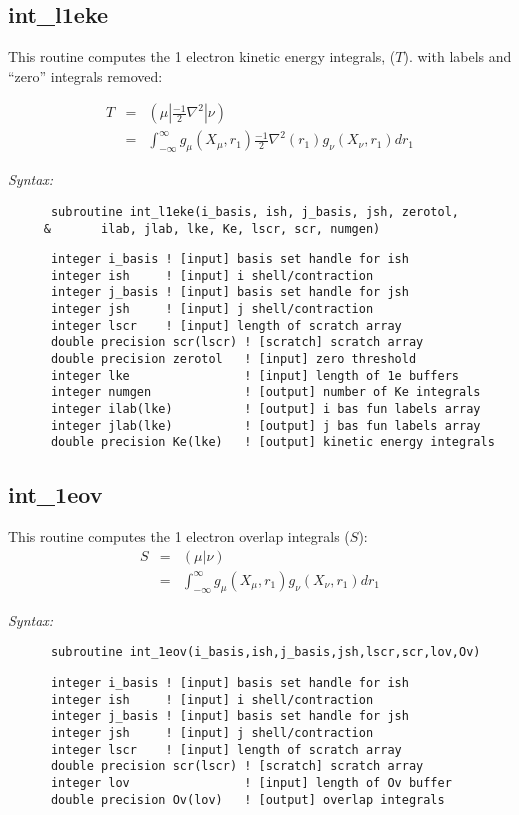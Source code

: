 \subsection{int\_l1eke} 
This routine computes the 1 electron kinetic energy integrals, ($T$). 
with labels and ``zero'' integrals removed: 
 
\begin{eqnarray*} 
T & = & ({\mu}|\frac{-1}{2}\nabla^{2}|{\nu}) \\ 
  & = & \int_{-\infty}^{\infty} g_{\mu}(X_{\mu},r_{1})\frac{-1}{2}\nabla^{2}(r_{1})g_{\nu}(X_{\nu},r_{1})dr_{1} 
\end{eqnarray*} 
 
{\it Syntax:} 
\begin{verbatim} 
      subroutine int_l1eke(i_basis, ish, j_basis, jsh, zerotol, 
     &       ilab, jlab, lke, Ke, lscr, scr, numgen)  
\end{verbatim} 
\begin{verbatim} 
      integer i_basis ! [input] basis set handle for ish 
      integer ish     ! [input] i shell/contraction 
      integer j_basis ! [input] basis set handle for jsh 
      integer jsh     ! [input] j shell/contraction 
      integer lscr    ! [input] length of scratch array 
      double precision scr(lscr) ! [scratch] scratch array 
      double precision zerotol   ! [input] zero threshold 
      integer lke                ! [input] length of 1e buffers 
      integer numgen             ! [output] number of Ke integrals 
      integer ilab(lke)          ! [output] i bas fun labels array 
      integer jlab(lke)          ! [output] j bas fun labels array 
      double precision Ke(lke)   ! [output] kinetic energy integrals 
\end{verbatim} 
\subsection{int\_1eov} 
This routine computes the 1 electron overlap integrals ($S$): 
\begin{eqnarray*} 
S & = & ({\mu}|{\nu}) \\ 
  & = & \int_{-\infty}^{\infty} g_{\mu}(X_{\mu},r_{1})g_{\nu}(X_{\nu},r_{1})dr_{1} 
\end{eqnarray*} 
 
{\it Syntax:} 
\begin{verbatim} 
      subroutine int_1eov(i_basis,ish,j_basis,jsh,lscr,scr,lov,Ov) 
\end{verbatim} 
\begin{verbatim} 
      integer i_basis ! [input] basis set handle for ish 
      integer ish     ! [input] i shell/contraction 
      integer j_basis ! [input] basis set handle for jsh 
      integer jsh     ! [input] j shell/contraction 
      integer lscr    ! [input] length of scratch array 
      double precision scr(lscr) ! [scratch] scratch array 
      integer lov                ! [input] length of Ov buffer 
      double precision Ov(lov)   ! [output] overlap integrals 
\end{verbatim} 
